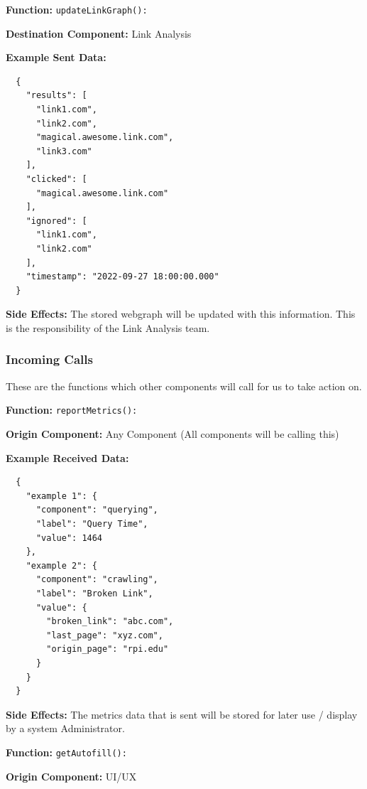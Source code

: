 \textbf{Function:} \verb|updateLinkGraph():|

\smallskip

\textbf{Destination Component:} Link Analysis

\smallskip

\textbf{Example Sent Data:} \begin{verbatim}
  {
    "results": [
      "link1.com",
      "link2.com", 
      "magical.awesome.link.com",
      "link3.com"
    ],
    "clicked": [
      "magical.awesome.link.com"
    ],
    "ignored": [
      "link1.com",
      "link2.com"
    ],
    "timestamp": "2022-09-27 18:00:00.000"
  }
\end{verbatim}

\smallskip

\textbf{Side Effects:} The stored webgraph will be updated with this information. This is the responsibility of the Link Analysis team. 

\newpage
\subsubsection*{Incoming Calls}
These are the functions which other components will call for us to take action on.

\textbf{Function:} \verb|reportMetrics():|

\smallskip

\textbf{Origin Component:} Any Component (All components will be calling this)

\smallskip

\textbf{Example Received Data:} \begin{verbatim}
  {
    "example 1": {
      "component": "querying",
      "label": "Query Time",
      "value": 1464
    },
    "example 2": {
      "component": "crawling",
      "label": "Broken Link",
      "value": {
        "broken_link": "abc.com",
        "last_page": "xyz.com",
        "origin_page": "rpi.edu"
      }
    }
  }
\end{verbatim}

\smallskip

\textbf{Side Effects:} The metrics data that is sent will be stored for later use / display by a system Administrator.

\bigskip

\textbf{Function:} \verb|getAutofill():|

\smallskip

\textbf{Origin Component:} UI/UX

\smallskip

